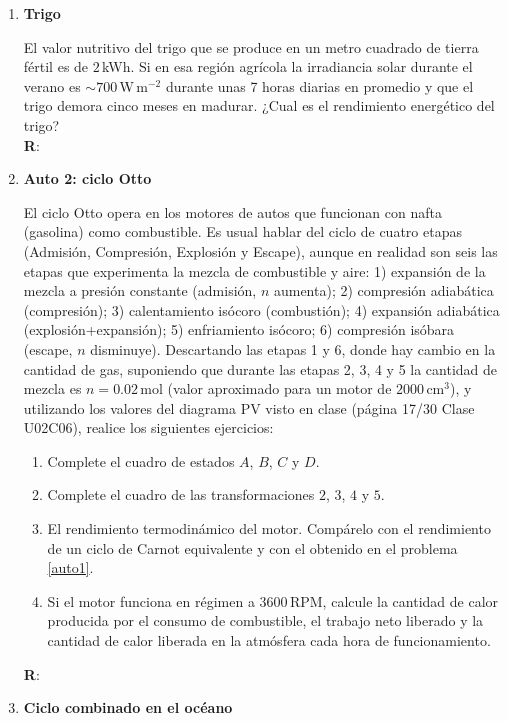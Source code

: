 \documentclass[a4paper,12pt]{article}
\begin{document}
\begin{enumerate}
	\item {\bf{Trigo}}
		
		El valor nutritivo del trigo que se produce en un metro cuadrado de
		tierra fértil es de $2$\,kWh. Si en esa región agrícola la irradiancia solar
		durante el verano es $\sim 700$\,W\,m$^{-2}$ durante unas 7 horas
		diarias en promedio y que el trigo demora cinco meses en madurar.  
		¿Cual es el rendimiento energético del trigo? 
		\\{\bf{R}}:

	\item {\bf{Auto 2: ciclo Otto}}
		
		El ciclo Otto opera en los motores de autos que funcionan con nafta
		(gasolina) como combustible. Es usual hablar del ciclo de cuatro etapas
		(Admisión, Compresión, Explosión y Escape), aunque en realidad son seis
		las etapas que experimenta la mezcla de combustible y aire: 1)
		expansión de la mezcla a presión constante (admisión, $n$ aumenta); 2)
		compresión adiabática (compresión); 3) calentamiento isócoro
		(combustión); 4) expansión adiabática (explosión+expansión); 5)
		enfriamiento isócoro; 6) compresión isóbara (escape, $n$ disminuye).
		Descartando las etapas 1 y 6, donde hay cambio en la cantidad de gas,
		suponiendo que durante las etapas 2, 3, 4 y 5 la cantidad de mezcla es
		$n=0.02$\,mol (valor aproximado para un motor de $2000$\,cm$^3$), y
		utilizando los valores del diagrama PV visto en clase (página 17/30
		Clase U02C06), realice los siguientes ejercicios:  
		\begin{enumerate}
			\item Complete el cuadro de estados $A$, $B$, $C$ y $D$. 
			\item Complete el cuadro de las transformaciones $2$, $3$, $4$ y
				$5$.  
			\item El rendimiento termodinámico del motor. Compárelo con el
				rendimiento de un ciclo de Carnot equivalente y con el obtenido
				en el problema \ref{auto1}.
			\item Si el motor funciona en régimen a $3600$\,RPM, calcule la
				cantidad de calor producida por el consumo de combustible, el
				trabajo neto liberado y la cantidad de calor liberada en la
				atmósfera cada hora de funcionamiento.		
		\end{enumerate}
		{\bf{R}}: 

	\item {\bf{Ciclo combinado en el océano}} 
		

\end{enumerate}
\end{document}

